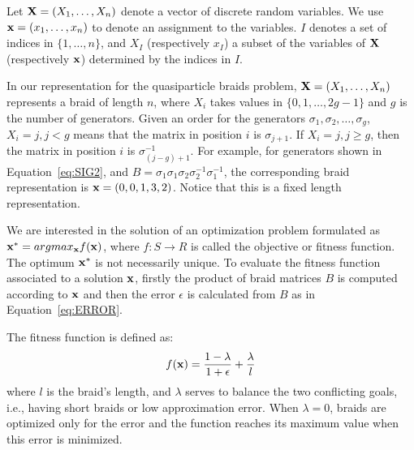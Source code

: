 

Let ${\bf{X}}=(X_1,\ldots ,X_n)$ denote a vector of discrete random variables. We use ${\bf{x}}=(x_1,\ldots ,x_n)$ to denote an assignment to the variables. $I$ denotes a set of indices in $\{1, \ldots, n\}$, and $X_I$ (respectively $x_I$) a subset of the variables of ${\bf{X}}$ (respectively ${\bf{x}}$) determined by the indices in $I$.

 In our representation for the quasiparticle braids problem,  ${\bf{X}}=(X_1,\ldots ,X_n)$ represents a braid of length $n$, where  
$X_i$ takes values in $\{0,1, \dots, 2g-1\}$ and $g$ is the number of generators. Given an order for the generators $\sigma_1, \sigma_2, \dots, \sigma_g$,  $X_i=j, j<g$ means that the matrix in position $i$ is $\sigma_{j+1}$. If $X_i =j, j \geq g$, then the matrix in position $i$ is $\sigma^{-1}_{(j-g)+1}$.  For example, for generators shown in Equation~\eqref{eq:SIG2}, and  $B=\sigma_1 \sigma_1 \sigma_2 \sigma_2^{-1} \sigma_1^{-1}$, the corresponding braid representation is  ${\bf{x}}=(0,0,1,3,2)$. Notice that this is a fixed length representation. 



We are interested in the solution of an optimization problem formulated as   ${\bf{x}}^* = arg max_{{\bf{x}}} f({\bf{x}})$,  where $f : S \rightarrow R$ is called the objective or fitness function. The optimum   ${\bf{x}}^*$ is not necessarily unique. To evaluate the fitness function associated to a solution ${\bf{x}}$, firstly the product of braid matrices $B$ is computed according to ${\bf{x}}$ and then the error $\epsilon$ is calculated from $B$ as in Equation~\eqref{eq:ERROR}. 

The fitness function  \cite{Mcdonald_and_Katzgraber:2013} is defined as:
\begin{equation}
 f({\bf{x}}) = \frac{1-\lambda}{1+\epsilon} + \frac{\lambda}{l} \label{eq:FITNESS}
\end{equation}
where $l$ is the braid's length, and $\lambda$ serves to balance the two conflicting goals, i.e., having short braids or low approximation error. When $\lambda=0$, braids are optimized only for the error and the function reaches its maximum value when this error is minimized. 

